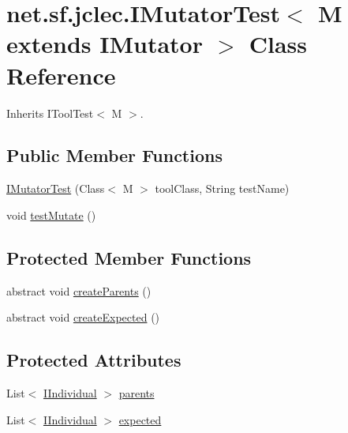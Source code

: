 \hypertarget{classnet_1_1sf_1_1jclec_1_1_i_mutator_test_3_01_m_01extends_01_i_mutator_01_4}{\section{net.\-sf.\-jclec.\-I\-Mutator\-Test$<$ M extends I\-Mutator $>$ Class Reference}
\label{classnet_1_1sf_1_1jclec_1_1_i_mutator_test_3_01_m_01extends_01_i_mutator_01_4}
}


Inherits I\-Tool\-Test$<$ M $>$.

\subsection*{Public Member Functions}
\begin{DoxyCompactItemize}
\item 
\hyperlink{classnet_1_1sf_1_1jclec_1_1_i_mutator_test_3_01_m_01extends_01_i_mutator_01_4_a2e586ee980f32a98160efb9a78dda05d}{I\-Mutator\-Test} (Class$<$ M $>$ tool\-Class, String test\-Name)
\item 
void \hyperlink{classnet_1_1sf_1_1jclec_1_1_i_mutator_test_3_01_m_01extends_01_i_mutator_01_4_a486cbad14cdce95477c442e2ed4cc014}{test\-Mutate} ()
\end{DoxyCompactItemize}
\subsection*{Protected Member Functions}
\begin{DoxyCompactItemize}
\item 
abstract void \hyperlink{classnet_1_1sf_1_1jclec_1_1_i_mutator_test_3_01_m_01extends_01_i_mutator_01_4_a7b878aeb7a70798a5ad256c0b3a3b35a}{create\-Parents} ()
\item 
abstract void \hyperlink{classnet_1_1sf_1_1jclec_1_1_i_mutator_test_3_01_m_01extends_01_i_mutator_01_4_a8a8fad66bd5cabbf50975f10bd578357}{create\-Expected} ()
\end{DoxyCompactItemize}
\subsection*{Protected Attributes}
\begin{DoxyCompactItemize}
\item 
List$<$ \hyperlink{interfacenet_1_1sf_1_1jclec_1_1_i_individual}{I\-Individual} $>$ \hyperlink{classnet_1_1sf_1_1jclec_1_1_i_mutator_test_3_01_m_01extends_01_i_mutator_01_4_a71b589875ad03dea370f15878842cfdf}{parents}
\item 
List$<$ \hyperlink{interfacenet_1_1sf_1_1jclec_1_1_i_individual}{I\-Individual} $>$ \hyperlink{classnet_1_1sf_1_1jclec_1_1_i_mutator_test_3_01_m_01extends_01_i_mutator_01_4_a7b5d60cf857bea9337b1c3e7d9124670}{expected}
\end{DoxyCompactItemize}


